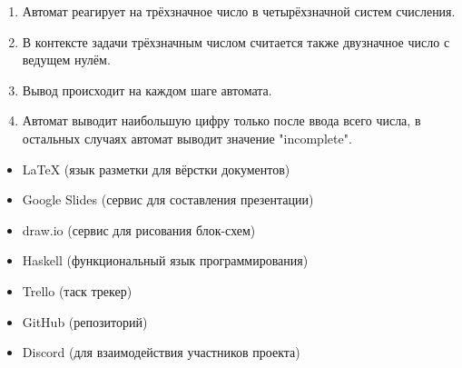 

\begin{enumerate}

	\item Автомат реагирует на трёхзначное число в четырёхзначной систем
		счисления.

	\item В контексте задачи трёхзначным числом считается также 
		двузначное число с ведущем нулём.

	\item Вывод происходит на каждом шаге автомата.

	\item Автомат выводит наибольшую цифру только после ввода всего 
		числа, в остальных случаях автомат выводит значение "incomplete".

\end{enumerate}




\begin{itemize}
	
	\item LaTeX (язык разметки для вёрстки документов)

	\item Google Slides (сервис для составления презентации)

	\item draw.io (сервис для рисования блок-схем)

	\item Haskell (функциональный язык программирования) 

	\item Trello (таск трекер)

	\item GitHub (репозиторий)

	\item Discord (для взаимодействия участников проекта)

\end{itemize} 

